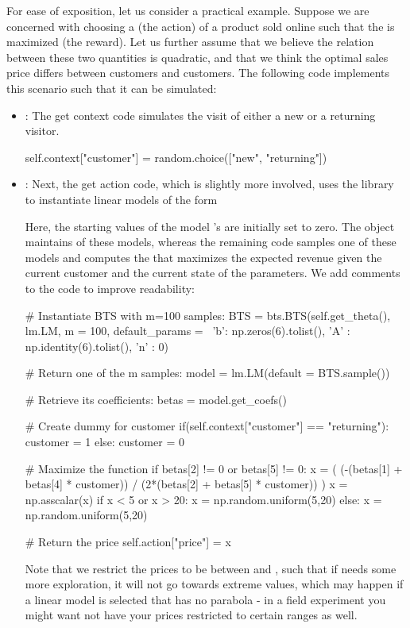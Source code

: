 \documentclass[nojss]{jss}
\begin{document}
For ease of exposition, let us consider a practical example. Suppose we are concerned with choosing a  (the action) of a product sold online such that the  is maximized (the reward). Let us further assume that we believe the relation between these two quantities is quadratic, and that we think the optimal sales price differs between  customers and  customers. The following code implements this scenario such that it can be simulated:

\begin{itemize}
\item {}: The get context code simulates the visit of either a new or a returning visitor.
\begin{Code}
self.context["customer"] = random.choice(["new", "returning"])
\end{Code}
\item {}: Next, the get action code, which is slightly more involved, uses the  library to instantiate  linear models of the form

Here, the starting values of the model 's are initially set to zero. The  object maintains  of these models, whereas the remaining code samples one of these  models and computes the  that maximizes the expected revenue given the current customer and the current state of the parameters. We add comments to the code to improve readability:

\begin{Code}
# Instantiate BTS with m=100 samples:
BTS = bts.BTS(self.get_theta(), lm.LM, m = 100, default_params = \
       {'b': np.zeros(6).tolist(), 'A' : np.identity(6).tolist(), 'n' : 0})

# Return one of the m samples:
model = lm.LM(default = BTS.sample())

# Retrieve its coefficients:
betas = model.get_coefs()

# Create dummy for customer
if(self.context["customer"] == "returning"):
    customer = 1
else:
    customer = 0

# Maximize the function
if betas[2] != 0 or betas[5] != 0:
    x = ( (-(betas[1] + betas[4] * customer)) / 
        (2*(betas[2] + betas[5] * customer)) )
    x = np.asscalar(x)
    if x < 5 or x > 20:
        x = np.random.uniform(5,20)
else:
    x = np.random.uniform(5,20)

# Return the price
self.action["price"] = x
\end{Code}
Note that we restrict the prices to be between  and , such that if  needs some more exploration, it will not go towards extreme values, which may happen if a linear model is selected that has no parabola - in a field experiment you might want not have your prices restricted to certain ranges as well.


\end{itemize}
\end{document}
